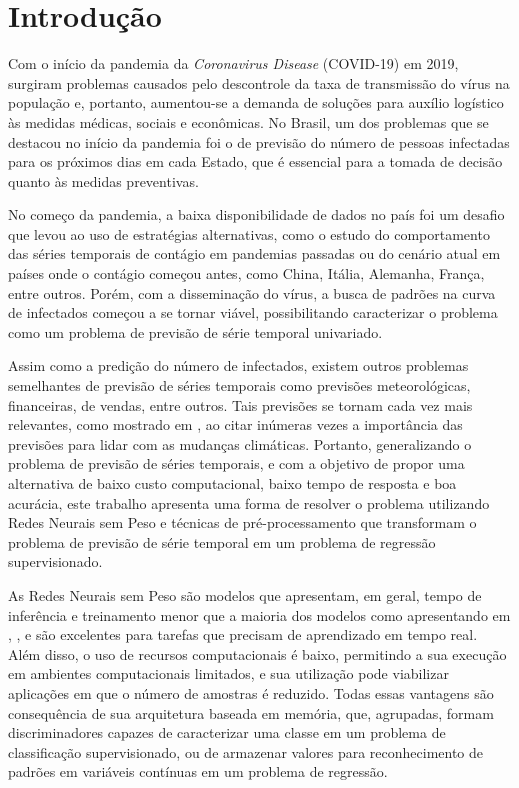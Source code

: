 \chapter{Introdução}

Com o início da pandemia da \textit{Coronavirus Disease} (COVID-19) em 2019, surgiram problemas causados pelo descontrole da taxa de transmissão do vírus na população e, portanto, aumentou-se a demanda de soluções para auxílio logístico às medidas médicas, sociais e econômicas. No Brasil, um dos problemas que se destacou no início da pandemia foi o de previsão do número de pessoas infectadas para os próximos dias em cada Estado, que é essencial para a tomada de decisão quanto às medidas preventivas.

No começo da pandemia, a baixa disponibilidade de dados no país foi um desafio que levou ao uso de estratégias alternativas, como o estudo do comportamento das séries temporais de contágio em pandemias passadas ou do cenário atual em países onde o contágio começou antes, como China, Itália, Alemanha, França, entre outros. Porém, com a disseminação do vírus, a busca de padrões na curva de infectados começou a se tornar viável, possibilitando caracterizar o problema como um problema de previsão de série temporal univariado.

Assim como a predição do número de infectados, existem outros problemas semelhantes de previsão de séries temporais como previsões meteorológicas, financeiras, de vendas, entre outros. Tais previsões se tornam cada vez mais relevantes, como mostrado em \citeauthor{DBLP:journals/corr/abs-1906-05433}, \citeyear{DBLP:journals/corr/abs-1906-05433} \cite{DBLP:journals/corr/abs-1906-05433} ao citar inúmeras vezes a importância das previsões para lidar com as mudanças climáticas. Portanto, generalizando o problema de previsão de séries temporais, e com a objetivo de propor uma alternativa de baixo custo computacional, baixo tempo de resposta e boa acurácia, este trabalho apresenta uma forma de resolver o problema utilizando Redes Neurais sem Peso e técnicas de pré-processamento que transformam o problema de previsão de série temporal em um problema de regressão supervisionado.

As Redes Neurais sem Peso são modelos que apresentam, em geral, tempo de inferência e treinamento menor que a maioria dos modelos como apresentando em \citeauthor{advanceswns}, \citeyear{advanceswns} \cite{advanceswns}, e são excelentes para tarefas que precisam de aprendizado em tempo real. Além disso, o uso de recursos computacionais é baixo, permitindo a sua execução em ambientes computacionais limitados, e sua utilização pode viabilizar aplicações em que o número de amostras é reduzido. Todas essas vantagens são consequência de sua arquitetura baseada em memória, que, agrupadas, formam discriminadores capazes de caracterizar uma classe em um problema de classificação supervisionado, ou de armazenar valores para reconhecimento de padrões em variáveis contínuas em um problema de regressão.

